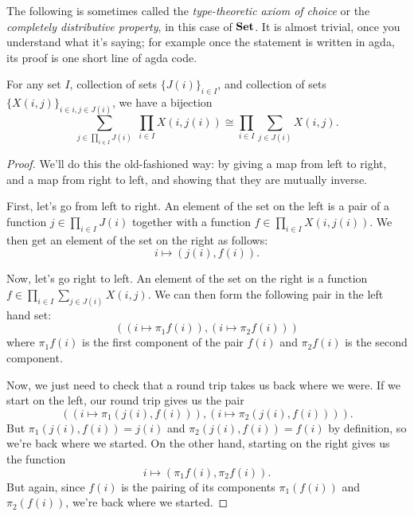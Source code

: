 \documentclass[DynamicalBook]{subfiles}
\begin{document}
The following is sometimes called the \emph{type-theoretic axiom of choice} or the \emph{completely distributive property}, in this case of $\textbf{Set}$. It is almost trivial, once you understand what it's saying; for example once the statement is written in agda, its proof is one short line of agda code. 

\begin{proposition}\label{prop.push_prod_sum_set}
For any set $I$, collection of sets $\{J(i)\}_{i\in I}$, and collection of sets $\{X(i,j)\}_{i\in i, j\in J(i)}$, we have a bijection
\begin{equation}\label{eqn.set_completely_distributive}
\sum_{j\in \prod_{i\in I}J(i)}\;\prod_{i\in I}X(i,j(i))
\cong
\prod_{i\in I}\sum_{j\in J(i)}X(i,j).
\end{equation}
\end{proposition}
\begin{proof}
We'll do this the old-fashioned way: by giving a map from left to right, and a
map from right to left, and showing that they are mutually inverse. 

First, let's go from left to right. An element of the set on the left is a pair
of a function $j \in \prod_{i \in I}J(i)$ together with a function $f \in
\prod_{i \in I} X(i, j(i))$. We then get an element of the set on the right as follows:
\[i \mapsto (j(i), f(i)).\]

Now, let's go right to left. An element of the set on the right is a function $f
\in \prod_{i \in I} \sum_{j \in J(i)} X(i, j)$. We can then form the following
pair in the left hand set:
\[((i \mapsto \pi_1f(i)), (i \mapsto \pi_2f(i)))\]
where $\pi_1f(i)$ is the first component of the pair $f(i)$ and $\pi_2f(i)$
is the second component.

Now, we just need to check that a round trip takes us back where we were. If we
start on the left, our round trip gives us the pair
\[((i \mapsto \pi_1(j(i), f(i))), (i \mapsto \pi_2(j(i), f(i)))).\]
But $\pi_1(j(i), f(i)) = j(i)$ and $\pi_2(j(i), f(i)) = f(i)$ by definition, so
we're back where we started. On the other hand, starting on the right gives us
the function
\[i \mapsto (\pi_1f(i), \pi_2f(i)).\]
But again, since $f(i)$ is the pairing of its components $\pi_1(f(i))$ and
$\pi_2(f(i))$, we're back where we started.

\end{proof}
\end{document}

